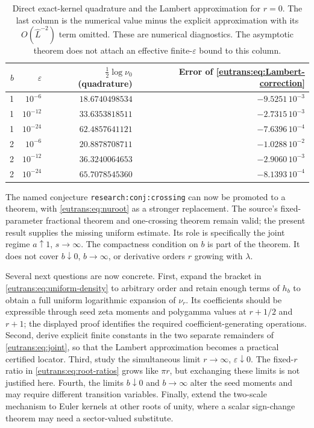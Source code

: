 \documentclass[11pt,a4paper]{article}
\numberwithin{equation}{section}
\theoremstyle{definition}
\theoremstyle{remark}
\begin{document}
\begin{table}[tbp]
\centering\small
\begin{tabular}{rrrr}
\hline
$b$ & $\varepsilon$ & $\tfrac12\log\nu_0$ (quadrature)
 & Error of \eqref{eutrans:eq:Lambert-correction}\\
\hline
1 & $10^{-6}$  & $18.6740498534$ & $-9.5251\,10^{-3}$\\
1 & $10^{-12}$ & $33.6353818511$ & $-2.7315\,10^{-3}$\\
1 & $10^{-24}$ & $62.4857641121$ & $-7.6396\,10^{-4}$\\
2 & $10^{-6}$  & $20.8878708711$ & $-1.0288\,10^{-2}$\\
2 & $10^{-12}$ & $36.3240064653$ & $-2.9060\,10^{-3}$\\
2 & $10^{-24}$ & $65.7078545360$ & $-8.1393\,10^{-4}$\\
\hline
\end{tabular}
\caption{Direct exact-kernel quadrature and the Lambert approximation
for $r=0$. The last column is the numerical value minus the explicit
approximation with its $O(\widehat L^{-2})$ term omitted. These are
numerical diagnostics. The asymptotic theorem does not attach an
effective finite-$\varepsilon$ bound to this column.}
\label{eutrans:tab:diagnostics}
\end{table}

The named conjecture \texttt{research:conj:crossing} can now be
promoted to a theorem, with \eqref{eutrans:eq:nuroot} as a stronger
replacement. The source's fixed-parameter fractional theorem and
one-crossing theorem remain valid; the present result supplies the
missing uniform estimate. Its role is specifically the joint regime
$a\uparrow1$, $s\to\infty$. The compactness condition on $b$ is part
of the theorem. It does not cover $b\downarrow0$, $b\to\infty$, or
derivative orders $r$ growing with $\lambda$.

Several next questions are now concrete. First, expand the bracket in
\eqref{eutrans:eq:uniform-density} to arbitrary order and retain enough
terms of $h_b$ to obtain a full uniform logarithmic expansion of
$\nu_r$. Its coefficients should be expressible through seed zeta
moments and polygamma values at $r+1/2$ and $r+1$; the displayed
proof identifies the required coefficient-generating operations.
Second, derive explicit finite constants in the two separate
remainders of \eqref{eutrans:eq:joint}, so that the Lambert approximation
becomes a practical certified locator. Third, study the simultaneous
limit $r\to\infty$, $\varepsilon\downarrow0$. The fixed-$r$ ratio
in \eqref{eutrans:eq:root-ratios} grows like $\pi r$, but exchanging
these limits is not justified here. Fourth, the limits $b\downarrow0$
and $b\to\infty$ alter the seed moments and may require different
transition variables. Finally, extend the two-scale mechanism to
Euler kernels at other roots of unity, where a scalar sign-change
theorem may need a sector-valued substitute.
\end{document}
